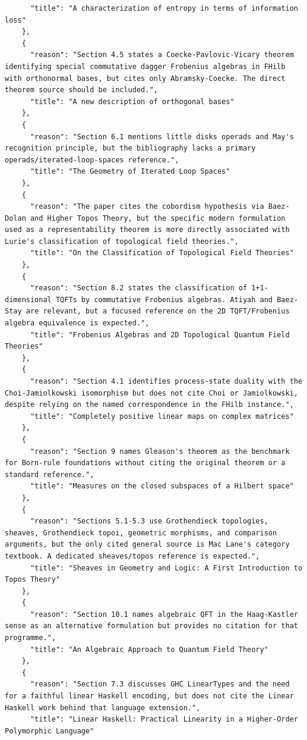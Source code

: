 \documentclass[11pt]{article}
\begin{document}
\begin{verbatim}
      "title": "A characterization of entropy in terms of information loss"
    },
    {
      "reason": "Section 4.5 states a Coecke-Pavlovic-Vicary theorem identifying special commutative dagger Frobenius algebras in FHilb with orthonormal bases, but cites only Abramsky-Coecke. The direct theorem source should be included.",
      "title": "A new description of orthogonal bases"
    },
    {
      "reason": "Section 6.1 mentions little disks operads and May's recognition principle, but the bibliography lacks a primary operads/iterated-loop-spaces reference.",
      "title": "The Geometry of Iterated Loop Spaces"
    },
    {
      "reason": "The paper cites the cobordism hypothesis via Baez-Dolan and Higher Topos Theory, but the specific modern formulation used as a representability theorem is more directly associated with Lurie's classification of topological field theories.",
      "title": "On the Classification of Topological Field Theories"
    },
    {
      "reason": "Section 8.2 states the classification of 1+1-dimensional TQFTs by commutative Frobenius algebras. Atiyah and Baez-Stay are relevant, but a focused reference on the 2D TQFT/Frobenius algebra equivalence is expected.",
      "title": "Frobenius Algebras and 2D Topological Quantum Field Theories"
    },
    {
      "reason": "Section 4.1 identifies process-state duality with the Choi-Jamiolkowski isomorphism but does not cite Choi or Jamiolkowski, despite relying on the named correspondence in the FHilb instance.",
      "title": "Completely positive linear maps on complex matrices"
    },
    {
      "reason": "Section 9 names Gleason's theorem as the benchmark for Born-rule foundations without citing the original theorem or a standard reference.",
      "title": "Measures on the closed subspaces of a Hilbert space"
    },
    {
      "reason": "Sections 5.1-5.3 use Grothendieck topologies, sheaves, Grothendieck topoi, geometric morphisms, and comparison arguments, but the only cited general source is Mac Lane's category textbook. A dedicated sheaves/topos reference is expected.",
      "title": "Sheaves in Geometry and Logic: A First Introduction to Topos Theory"
    },
    {
      "reason": "Section 10.1 names algebraic QFT in the Haag-Kastler sense as an alternative formulation but provides no citation for that programme.",
      "title": "An Algebraic Approach to Quantum Field Theory"
    },
    {
      "reason": "Section 7.3 discusses GHC LinearTypes and the need for a faithful linear Haskell encoding, but does not cite the Linear Haskell work behind that language extension.",
      "title": "Linear Haskell: Practical Linearity in a Higher-Order Polymorphic Language"

\end{verbatim}
\end{document}
